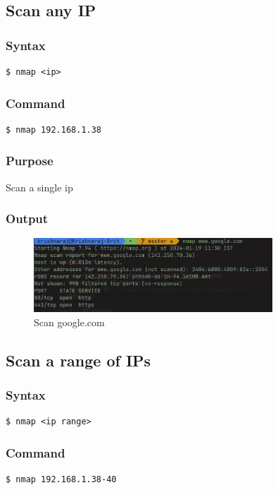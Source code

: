 \documentclass[11pt]{article}
\begin{document}
\subsection{Scan any IP}

\subsubsection{Syntax}
\begin{verbatim}
$ nmap <ip>
\end{verbatim}

\subsubsection*{Command}
\begin{verbatim}
$ nmap 192.168.1.38
\end{verbatim}

\subsubsection*{Purpose}
Scan a single ip

\subsubsection*{Output}
\begin{figure}[H]
    \centering
    \includegraphics[width=0.8\textwidth]{nmap google.png}
    \caption{Scan google.com}
    \label{fig:1}
\end{figure}

\subsection{Scan a range of IPs}

\subsubsection{Syntax}
\begin{verbatim}
$ nmap <ip range>
\end{verbatim}

\subsubsection*{Command}
\begin{verbatim}
$ nmap 192.168.1.38-40
\end{verbatim}
\end{document}
